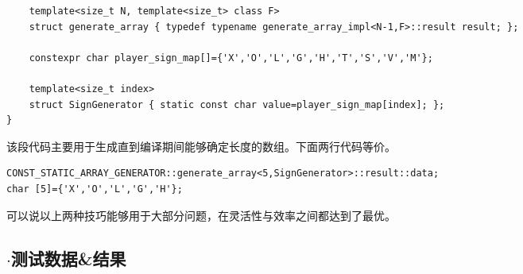 \documentclass[9pt,twocolumn,twoside]{osajnl}
\begin{document}
\begin{adjustwidth}{2em}{}
\begin{lstlisting}
	template<size_t N, template<size_t> class F>
	struct generate_array { typedef typename generate_array_impl<N-1,F>::result result; };

	constexpr char player_sign_map[]={'X','O','L','G','H','T','S','V','M'}; 

	template<size_t index>
	struct SignGenerator { static const char value=player_sign_map[index]; };
}
\end{lstlisting}	
该段代码主要用于生成直到编译期间能够确定长度的数组。下面两行代码等价。
\begin{lstlisting}
CONST_STATIC_ARRAY_GENERATOR::generate_array<5,SignGenerator>::result::data;	
char [5]={'X','O','L','G','H'};
\end{lstlisting}

可以说以上两种技巧能够用于大部分问题，在灵活性与效率之间都达到了最优。
\end{adjustwidth}
\subsection{$\cdot$测试数据\&结果}
\end{document}
